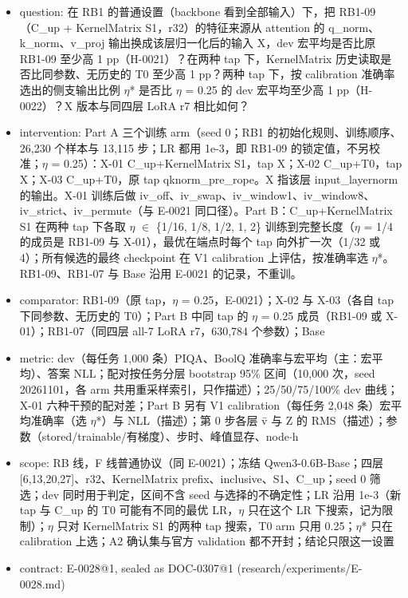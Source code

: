 \documentclass[11pt]{article}
\begin{document}
\begin{itemize}
\item question: 在 RB1 的普通设置（backbone 看到全部输入）下，把 RB1-09（C\_up + KernelMatrix S1，r32）的特征来源从 attention 的 q\_norm、k\_norm、v\_proj 输出换成该层归一化后的输入 X，dev 宏平均是否比原 RB1-09 至少高 1 pp（H-0021）？在两种 tap 下，KernelMatrix 历史读取是否比同参数、无历史的 T0 至少高 1 pp？两种 tap 下，按 calibration 准确率选出的侧支输出比例 \ensuremath{\eta}* 是否比 \ensuremath{\eta} = 0.25 的 dev 宏平均至少高 1 pp（H-0022）？X 版本与同四层 LoRA r7 相比如何？
\item intervention: Part A 三个训练 arm（seed 0；RB1 的初始化规则、训练顺序、26,230 个样本与 13,115 步；LR 都用 1e-3，即 RB1-09 的锁定值，不另校准；\ensuremath{\eta} = 0.25）：X-01 C\_up+KernelMatrix S1，tap X；X-02 C\_up+T0，tap X；X-03 C\_up+T0，原 tap qknorm\_pre\_rope。X 指该层 input\_layernorm 的输出。X-01 训练后做 iv\_off、iv\_swap、iv\_window1、iv\_window8、iv\_strict、iv\_permute（与 E-0021 同口径）。Part B：C\_up+KernelMatrix S1 在两种 tap 下各取 \ensuremath{\eta} \ensuremath{\in} \{1/16, 1/8, 1/2, 1, 2\} 训练到完整长度（\ensuremath{\eta} = 1/4 的成员是 RB1-09 与 X-01），最优在端点时每个 tap 向外扩一次（1/32 或 4）；所有候选的最终 checkpoint 在 V1 calibration 上评估，按准确率选 \ensuremath{\eta}*。RB1-09、RB1-07 与 Base 沿用 E-0021 的记录，不重训。
\item comparator: RB1-09（原 tap，\ensuremath{\eta} = 0.25，E-0021）；X-02 与 X-03（各自 tap 下同参数、无历史的 T0）；Part B 中同 tap 的 \ensuremath{\eta} = 0.25 成员（RB1-09 或 X-01）；RB1-07（同四层 all-7 LoRA r7，630,784 个参数）；Base
\item metric: dev（每任务 1,000 条）PIQA、BoolQ 准确率与宏平均（主：宏平均）、答案 NLL；配对按任务分层 bootstrap 95\% 区间（10,000 次，seed 20261101，各 arm 共用重采样索引，只作描述）；25/50/75/100\% dev 曲线；X-01 六种干预的配对差；Part B 另有 V1 calibration（每任务 2,048 条）宏平均准确率（选 \ensuremath{\eta}*）与 NLL（描述）；第 0 步各层 v̄ 与 Z 的 RMS（描述）；参数（stored/trainable/有梯度）、步时、峰值显存、node\ensuremath{\cdot}h
\item scope: RB 线，F 线普通协议（同 E-0021）；冻结 Qwen3-0.6B-Base；四层 [6,13,20,27]、r32、KernelMatrix prefix、inclusive、S1、C\_up；seed 0 筛选；dev 同时用于判定，区间不含 seed 与选择的不确定性；LR 沿用 1e-3（新 tap 与 C\_up 的 T0 可能有不同的最优 LR，\ensuremath{\eta} 只在这个 LR 下搜索，记为限制）；\ensuremath{\eta} 只对 KernelMatrix S1 的两种 tap 搜索，T0 arm 只用 0.25；\ensuremath{\eta}* 只在 calibration 上选；A2 确认集与官方 validation 都不开封；结论只限这一设置
\item contract: E-0028@1, sealed as DOC-0307@1 (research/experiments/E-0028.md)
\end{itemize}
\end{document}
